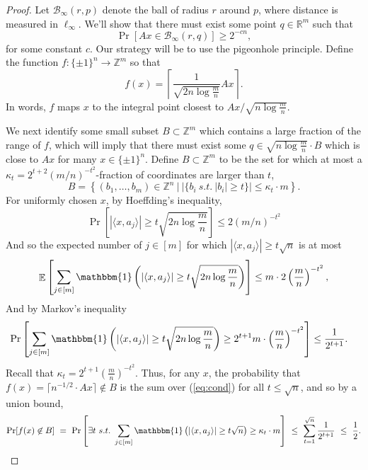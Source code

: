 \documentclass{article}
\theoremstyle{theorem}
\theoremstyle{definition}
\newcommand{\R}{\mathbb{R}}
\newcommand{\Z}{\mathbb{Z}}
\newcommand{\iprod}[1]{\langle #1 \rangle}
\newcommand{\E}{\mathop{\mathbb{E}}}
\newcommand{\cB}{\mathcal{B}}
\newcommand{\Ind}{\mathbbm{1}}
\begin{document}
\begin{proof}
    Let $\cB_{\infty}(r,p)$ denote the ball of radius $r$ around $p$, where distance is measured in $\ell_\infty$.
    We'll show that there must exist some point $q \in \R^m$ such that
    \[
	\Pr[ Ax \in \cB_{\infty}(r,q)] \ge 2^{-cn},
    \]
for some constant $c$.
    Our strategy will be to use the pigeonhole principle.
    Define the function $f:\{\pm 1\}^n \to \Z^m$ so that
    \[
	f(x) = \left\lceil \frac{1}{\sqrt {2n\log \frac{m}{n}}} Ax\right\rceil.
    \]
In words, $f$ maps $x$ to the integral point closest to $Ax/\sqrt{n\log \frac{m}{n}}$.

We next identify some small subset $B \subset \Z^m$ which contains a large fraction of the range of $f$, which will imply that there must exist some $q \in \sqrt{n\log\frac{m}{n}}\cdot B$ which is close to $Ax$ for many $x \in \{\pm 1\}^n$.
    Define $B \subset \Z^m$ to be the set for which at most a $\kappa_t = 2^{t+2} (m/n)^{-t^2}$-fraction of coordinates are larger than $t$,
    \[
	B = \left\{(b_1,\ldots,b_m) \in \Z^n ~|~ |\{b_i ~s.t.~ |b_i| \ge t\}| \le \kappa_t \cdot m\right\}.
    \]
    For uniformly chosen $x$, by Hoeffding's inequality,
    \[
	\Pr\left[ |\iprod{x,a_j}| \ge t \sqrt{2n\log\frac{m}{n}} \right]\le 2\left(m/n\right)^{-t^2}
    \]
    And so the expected number of $j \in [m]$ for which $|\iprod{x,a_j}| \ge t\sqrt{n}$ is at most
    \[
	\E\left[\sum_{j\in[m]} \Ind\left(\left|\iprod{x,a_j}\right| \ge t\sqrt{2n\log\frac{m}{n}}\right) \right] \le m \cdot 2\left(\frac{m}{n}\right)^{-t^2},
    \]
    And by Markov's inequality
    \begin{align}
	\Pr\left[\sum_{j\in[m]} \Ind\left(\left|\iprod{x,a_j}\right| \ge t\sqrt{2n\log\frac{m}{n}}\right) \ge 2^{t+1} m \cdot \left(\frac{m}{n}\right)^{-t^2}\right]
	&\le \frac{1}{2^{t+1}}.\label{eq:cond}
    \end{align}
    Recall that $\kappa_t = 2^{t+1} \left(\frac{m}{n}\right)^{-t^2}$.
    Thus, for any $x$, the probability that $f(x) = \lceil n^{-1/2} \cdot Ax\rceil \not\in B$ is the sum over (\ref{eq:cond}) for all $t \le \sqrt{n}$, and so by a union bound,
    \begin{align*}
	\Pr[f(x) \not \in B]
	~=~ \Pr\left[\exists t ~s.t.~ \sum_{j \in [m]} \Ind\left(|\iprod{x,a_j}| \ge t\sqrt{n}\right) \ge \kappa_t \cdot m\right]
	~\le~ \sum_{t=1}^{\sqrt{n}} \frac{1}{2^{t+1}}
	~\le~ \frac{1}{2}.
    \end{align*}


\end{proof}
\end{document}
